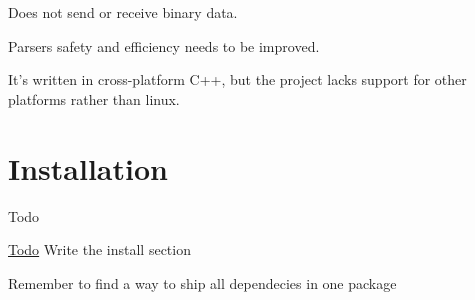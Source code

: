 \begin{DoxyItemize}
\item Does not send or receive binary data.
\item Parsers safety and efficiency needs to be improved.
\item It's written in cross-\/platform C++, but the project lacks support for other platforms rather than linux.
\end{DoxyItemize}\hypertarget{index_install}{}\section{Installation}\label{index_install}
\begin{DoxyRefDesc}{Todo}
\item[\hyperlink{todo__todo000001}{Todo}]Write the install section 

Remember to find a way to ship all dependecies in one package \end{DoxyRefDesc}
